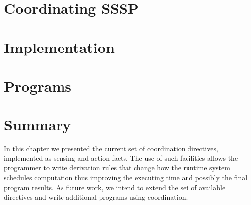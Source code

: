 \section{Coordinating SSSP}


\section{Implementation}


\section{Programs}



\section{Summary}

In this chapter we presented the current set of coordination directives,
implemented as sensing and action facts. The use of such facilities allows the
programmer to write derivation rules that change how the runtime system
schedules computation thus improving the executing time and possibly the final
program results. As future work, we intend to extend the set of available
directives and write additional programs using coordination.
